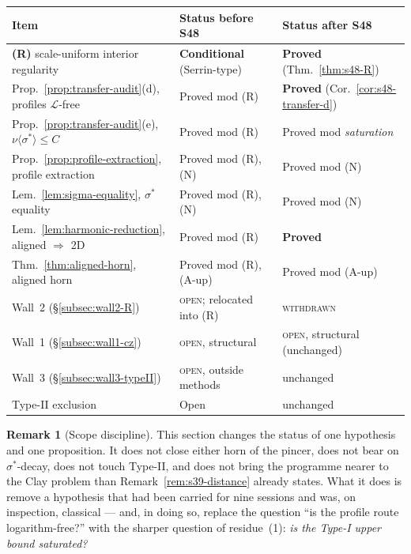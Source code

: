 \documentclass[11pt]{article}
\theoremstyle{definition}
\newtheorem{remark}[theorem]{Remark}
\theoremstyle{remark}
\begin{document}
\begin{center}
\begin{tabular}{@{}l l l@{}}
\hline
Item & Status before S48 & Status after S48 \\
\hline
\textbf{(R)} scale-uniform interior regularity
  & \textbf{Conditional} (Serrin-type) & \textbf{Proved}
    (Thm.~\ref{thm:s48-R}) \\
Prop.~\ref{prop:transfer-audit}(d), profiles $\mathcal{L}$-free
  & Proved mod (R) & \textbf{Proved} (Cor.~\ref{cor:s48-transfer-d}) \\
Prop.~\ref{prop:transfer-audit}(e), $\nu\langle\sigma^*\rangle\leq C$
  & Proved mod (R) & Proved mod \emph{saturation} \\
Prop.~\ref{prop:profile-extraction}, profile extraction
  & Proved mod (R),(N) & Proved mod (N) \\
Lem.~\ref{lem:sigma-equality}, $\sigma^*$ equality
  & Proved mod (R),(N) & Proved mod (N) \\
Lem.~\ref{lem:harmonic-reduction}, aligned $\Rightarrow$ 2D
  & Proved mod (R) & \textbf{Proved} \\
Thm.~\ref{thm:aligned-horn}, aligned horn
  & Proved mod (R),(A-up) & Proved mod (A-up) \\
Wall~2 (\S\ref{subsec:wall2-R})
  & \textsc{open}; relocated into (R) & \textsc{withdrawn} \\
Wall~1 (\S\ref{subsec:wall1-cz})
  & \textsc{open}, structural & \textsc{open}, structural (unchanged) \\
Wall~3 (\S\ref{subsec:wall3-typeII})
  & \textsc{open}, outside methods & unchanged \\
Type-II exclusion & Open & unchanged \\
\hline
\end{tabular}
\end{center}

\begin{remark}[Scope discipline]\label{rem:s48-scope}
  This section changes the status of one hypothesis and one proposition. It
  does not close either horn of the pincer, does not bear on
  $\sigma^*$-decay, does not touch Type-II, and does not bring the programme
  nearer to the Clay problem than Remark~\ref{rem:s39-distance} already
  states. What it does is remove a hypothesis that had been carried for nine
  sessions and was, on inspection, classical --- and, in doing so, replace the
  question ``is the profile route logarithm-free?'' with the sharper question
  of residue~(1): \emph{is the Type-I upper bound saturated?}
\end{remark}
\end{document}
